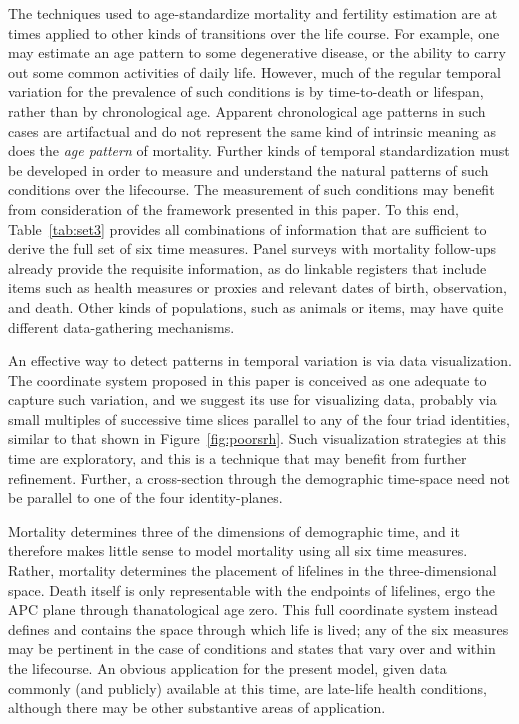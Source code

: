 \documentclass[12pt,oneside,a4paper]{article} %
\begin{document}
The techniques used to age-standardize mortality and fertility estimation are at
times applied to other kinds of transitions over the life course. For example,
one may estimate an age pattern to some degenerative disease, or the
ability to carry out some common activities of daily life. However, much of the
regular temporal variation for the prevalence of such conditions is by
time-to-death or lifespan, rather than by chronological age. Apparent chronological age patterns
in such cases are artifactual and do not represent the same kind of
intrinsic meaning as does the \textit{age pattern} of mortality. Further kinds
of temporal standardization must be developed in order to measure and understand
the natural patterns of such conditions over the lifecourse. 
The measurement of
such conditions may benefit from consideration of the framework presented in
this paper. To this end, Table~\ref{tab:set3} provides all combinations of
information that are sufficient to derive the full set of six time measures.
Panel surveys with mortality follow-ups already provide the requisite
information, as do linkable registers that include items such as
health measures or proxies and relevant dates of birth, observation, and death.
Other kinds of populations, such as animals or items, may have quite different
data-gathering mechanisms.

An effective way to detect patterns in temporal variation
is via data visualization. The coordinate system proposed in this paper is
conceived as one adequate to capture such variation, and we suggest its use
for visualizing data, probably via small multiples of successive time slices
parallel to any of the four triad identities, similar to that shown in
Figure~\ref{fig:poorsrh}.
Such visualization strategies at this time are exploratory, and this is a
technique that may benefit from further refinement. Further, a cross-section
through the demographic time-space need not be parallel to one of the four
identity-planes.

Mortality determines three of the dimensions of
demographic time, and it therefore makes little sense to model mortality using
all six time measures. Rather, mortality determines the placement of
lifelines in the three-dimensional space. Death itself is only representable
with the endpoints of lifelines, ergo the APC plane through thanatological age
zero. This full coordinate system instead defines and contains the space through
which life is lived; any of the six measures may be pertinent in the case of
conditions and states that vary over and within the lifecourse. An obvious
application for the present model, given data commonly (and publicly) available at this time, are late-life health conditions, although there may be other substantive areas of application. 
\end{document}
